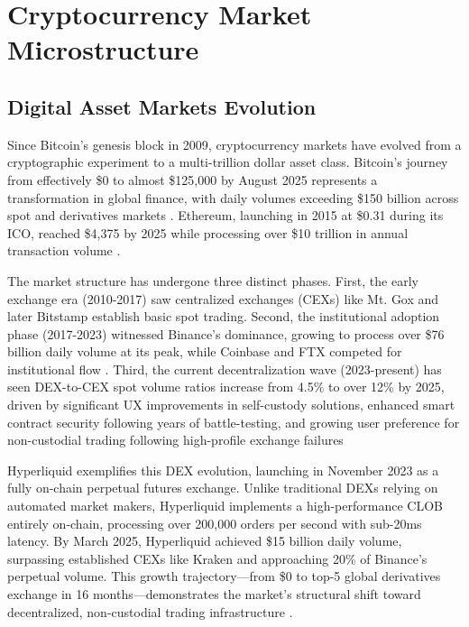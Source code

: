 \documentclass{report}
\begin{document}
\section{Cryptocurrency Market Microstructure}

\subsection{Digital Asset Markets Evolution}

Since Bitcoin's genesis block in 2009, cryptocurrency markets have evolved from a cryptographic experiment to a multi-trillion dollar asset class. Bitcoin's journey from effectively \$0 to almost \$125,000 by August 2025 represents a transformation in global finance, with daily volumes exceeding \$150 billion across spot and derivatives markets \cite{Nakamoto2008}. Ethereum, launching in 2015 at \$0.31 during its ICO, reached \$4,375 by 2025 while processing over \$10 trillion in annual transaction volume \cite{Buterin2014}.

The market structure has undergone three distinct phases. First, the early exchange era (2010-2017) saw centralized exchanges (CEXs) like Mt. Gox and later Bitstamp establish basic spot trading. Second, the institutional adoption phase (2017-2023) witnessed Binance's dominance, growing to process over \$76 billion daily volume at its peak, while Coinbase and FTX competed for institutional flow \cite{CoinGecko2024}. Third, the current decentralization wave (2023-present) has seen DEX-to-CEX spot volume ratios increase from 4.5\% to over 12\% by 2025, driven by significant UX improvements in self-custody solutions, enhanced smart contract security following years of battle-testing, and growing user preference for non-custodial trading following high-profile exchange failures \cite{CoinGecko2024}

Hyperliquid exemplifies this DEX evolution, launching in November 2023 as a fully on-chain perpetual futures exchange. Unlike traditional DEXs relying on automated market makers, Hyperliquid implements a high-performance CLOB entirely on-chain, processing over 200,000 orders per second with sub-20ms latency. By March 2025, Hyperliquid achieved \$15 billion daily volume, surpassing established CEXs like Kraken and approaching 20\% of Binance's perpetual volume. This growth trajectory—from \$0 to top-5 global derivatives exchange in 16 months—demonstrates the market's structural shift toward decentralized, non-custodial trading infrastructure \cite{HyperliquidDocs2024}.
\end{document}
